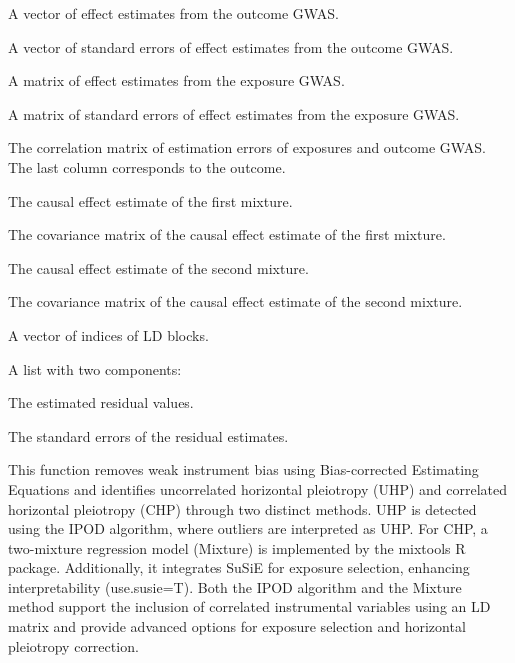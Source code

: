 \documentclass[a4paper]{book}
\begin{document}
%
\begin{Arguments}
\begin{ldescription}
\item[\code{by}] A vector of effect estimates from the outcome GWAS.

\item[\code{byse}] A vector of standard errors of effect estimates from the outcome GWAS.

\item[\code{bX}] A matrix of effect estimates from the exposure GWAS.

\item[\code{bXse}] A matrix of standard errors of effect estimates from the exposure GWAS.

\item[\code{Rxy}] The correlation matrix of estimation errors of exposures and outcome GWAS. The last column corresponds to the outcome.

\item[\code{theta1}] The causal effect estimate of the first mixture.

\item[\code{theta.cov1}] The covariance matrix of the causal effect estimate of the first mixture.

\item[\code{theta2}] The causal effect estimate of the second mixture.

\item[\code{theta.cov2}] The covariance matrix of the causal effect estimate of the second mixture.

\item[\code{LD.block}] A vector of indices of LD blocks.
\end{ldescription}
\end{Arguments}
%
\begin{Value}
A list with two components:
\begin{ldescription}
\item[\code{BETA}] The estimated residual values.
\item[\code{SE}] The standard errors of the residual estimates.
\end{ldescription}
\end{Value}
%
\begin{Description}
This function removes weak instrument bias using Bias-corrected Estimating Equations and identifies uncorrelated horizontal pleiotropy (UHP) and correlated horizontal pleiotropy (CHP) through two distinct methods. UHP is detected using the IPOD algorithm, where outliers are interpreted as UHP. For CHP, a two-mixture regression model (Mixture) is implemented by the mixtools R package. Additionally, it integrates SuSiE for exposure selection, enhancing interpretability (use.susie=T). Both the IPOD algorithm and the Mixture method support the inclusion of correlated instrumental variables using an LD matrix and provide advanced options for exposure selection and horizontal pleiotropy correction.
\end{Description}
\end{document}

